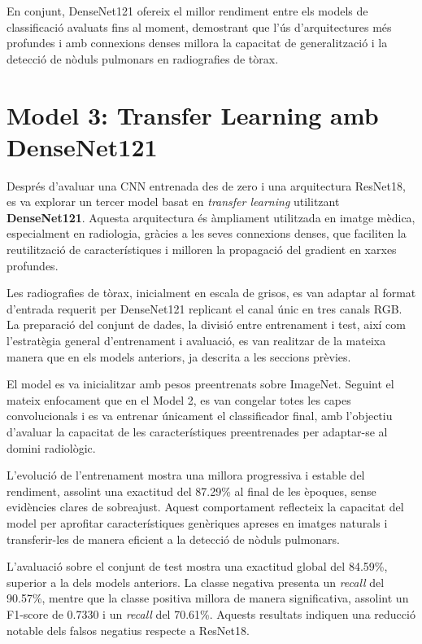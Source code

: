 \documentclass[conference]{IEEEtran}
\begin{document}
En conjunt, DenseNet121 ofereix el millor rendiment entre els models de
classificació avaluats fins al moment, demostrant que l’ús d’arquitectures més
profundes i amb connexions denses millora la capacitat de generalització i la
detecció de nòduls pulmonars en radiografies de tòrax.

\section{Model 3: Transfer Learning amb DenseNet121}

Després d’avaluar una CNN entrenada des de zero i una arquitectura ResNet18, es va
explorar un tercer model basat en \textit{transfer learning} utilitzant
\textbf{DenseNet121}. Aquesta arquitectura és àmpliament utilitzada en imatge
mèdica, especialment en radiologia, gràcies a les seves connexions denses, que
faciliten la reutilització de característiques i milloren la propagació del
gradient en xarxes profundes.

Les radiografies de tòrax, inicialment en escala de grisos, es van adaptar al format
d’entrada requerit per DenseNet121 replicant el canal únic en tres canals RGB. La
preparació del conjunt de dades, la divisió entre entrenament i test, així com
l’estratègia general d’entrenament i avaluació, es van realitzar de la mateixa
manera que en els models anteriors, ja descrita a les seccions prèvies.

El model es va inicialitzar amb pesos preentrenats sobre ImageNet. Seguint el mateix
enfocament que en el Model 2, es van congelar totes les capes convolucionals i es va
entrenar únicament el classificador final, amb l’objectiu d’avaluar la capacitat
de les característiques preentrenades per adaptar-se al domini radiològic.

L’evolució de l’entrenament mostra una millora progressiva i estable del rendiment,
assolint una exactitud del 87.29\% al final de les èpoques, sense evidències clares
de sobreajust. Aquest comportament reflecteix la capacitat del model per aprofitar
característiques genèriques apreses en imatges naturals i transferir-les de manera
eficient a la detecció de nòduls pulmonars.

L’avaluació sobre el conjunt de test mostra una exactitud global del 84.59\%,
superior a la dels models anteriors. La classe negativa presenta un \textit{recall}
del 90.57\%, mentre que la classe positiva millora de manera significativa,
assolint un F1-score de 0.7330 i un \textit{recall} del 70.61\%. Aquests resultats
indiquen una reducció notable dels falsos negatius respecte a ResNet18.
\end{document}
